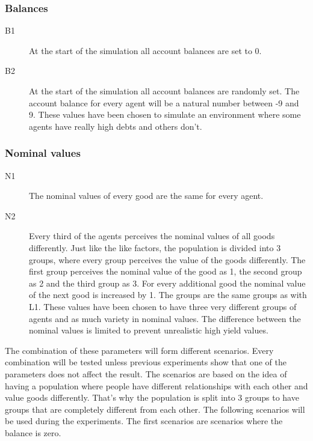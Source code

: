 \documentclass[twoside,openright]{uva-bachelor-thesis}
\begin{document}
\subsubsection{Balances}
\begin{description}
\item[B1] At the start of the simulation all account balances are set to 0.
\item[B2] At the start of the simulation all account balances are randomly set. The account balance for every agent will be a natural number between -9 and 9. These values have been chosen to simulate an environment where some agents have really high debts and others don't.
\end{description}
\subsubsection{Nominal values}
\begin{description}
\item[N1] The nominal values of every good are the same for every agent.
\item[N2] Every third of the agents perceives the nominal values of all goods differently. Just like the like factors, the population is divided into 3 groups, where every group perceives the value of the goods differently. The first group perceives the nominal value of the good as 1, the second group as 2 and the third group as 3. For every additional good the nominal value of the next good is increased by 1. The groups are the same groups as with L1. These values have been chosen to have three very different groups of agents and as much variety in nominal values. The difference between the nominal values is limited to prevent unrealistic high yield values.
\end{description} 
The combination of these parameters will form different scenarios. Every combination will be tested unless previous experiments show that one of the parameters does not affect the result. The scenarios are based on the idea of having a population where people have different relationships with each other and value goods differently. That’s why the population is split into 3 groups to have groups that are completely different from each other. The following scenarios will be used during the experiments.
The first scenarios are scenarios where the balance is zero.
\end{document}
